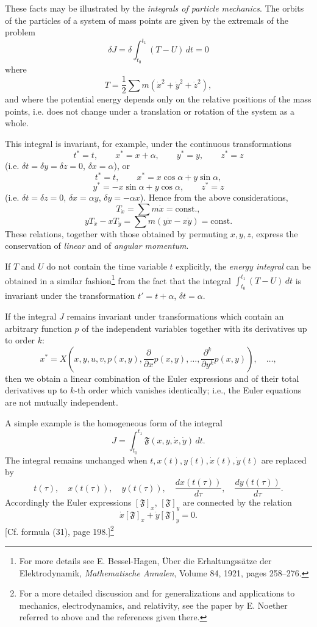 These facts may be illustrated by the \emph{integrals of particle mechanics}. The orbits of the particles of a system of mass points are given by the extremals of the problem
\[
\delta J=\delta\int_{t_0}^{t_1}(T-U)\,dt=0
\]
where
\[
T=\frac12\sum m(\dot x^2+\dot y^2+\dot z^2),
\]
and where the potential energy depends only on the relative positions of the mass points, i.e. does not change under a translation or rotation of the system as a whole.

This integral is invariant, for example, under the continuous transformations
\[
t^*=t,\qquad x^*=x+\alpha,\qquad y^*=y,\qquad z^*=z
\]
(i.e. $\delta t=\delta y=\delta z=0$, $\delta x=\alpha$), or
\[
t^*=t,\qquad x^*=x\cos\alpha+y\sin\alpha,
\]
\[
y^*=-x\sin\alpha+y\cos\alpha,\qquad z^*=z
\]
(i.e. $\delta t=\delta z=0$, $\delta x=\alpha y$, $\delta y=-\alpha x$).
Hence from the above considerations,
\[
T_{\dot x}=\sum m\dot x=\text{const.},
\]
\[
yT_{\dot x}-xT_{\dot y}=\sum m(y\dot x-x\dot y)=\text{const.}
\]
These relations, together with those obtained by permuting $x,y,z$, express the conservation of \emph{linear} and of \emph{angular momentum}.

If $T$ and $U$ do not contain the time variable $t$ explicitly, the \emph{energy integral} can be obtained in a similar fashion\footnote{For more details see E. Bessel-Hagen, \"Uber die Erhaltungss\"atze der Elektrodynamik, \emph{Mathematische Annalen}, Volume 84, 1921, pages 258--276.} from the fact that the integral $\int_{t_0}^{t_1}(T-U)\,dt$ is invariant under the transformation $t'=t+\alpha$, $\delta t=\alpha$.

If the integral $J$ remains invariant under transformations which contain an arbitrary function $p$ of the independent variables together with its derivatives up to order $k$:
\[
x^*=X\left(x,y,u,v,p(x,y),\frac{\partial}{\partial x}p(x,y),\ldots,\frac{\partial^k}{\partial y^k}p(x,y)\right),\quad\ldots,
\]
then we obtain a linear combination of the Euler expressions and of their total derivatives up to $k$-th order which vanishes identically; i.e., the Euler equations are not mutually independent.

A simple example is the homogeneous form of the integral
\[
J=\int_{t_0}^{t_1}\mathfrak F(x,y,\dot x,\dot y)\,dt.
\]
The integral remains unchanged when $t,x(t),y(t),\dot x(t),\dot y(t)$ are replaced by
\[
t(\tau),\quad x(t(\tau)),\quad y(t(\tau)),\quad
\frac{dx(t(\tau))}{d\tau},\quad\frac{dy(t(\tau))}{d\tau}.
\]
Accordingly the Euler expressions $[\mathfrak F]_x$, $[\mathfrak F]_y$ are connected by the relation
\[
\dot x[\mathfrak F]_x+\dot y[\mathfrak F]_y=0.
\]
[Cf. formula (31), page 198.]\footnote{For a more detailed discussion and for generalizations and applications to mechanics, electrodynamics, and relativity, see the paper by E. Noether referred to above and the references given there.}

